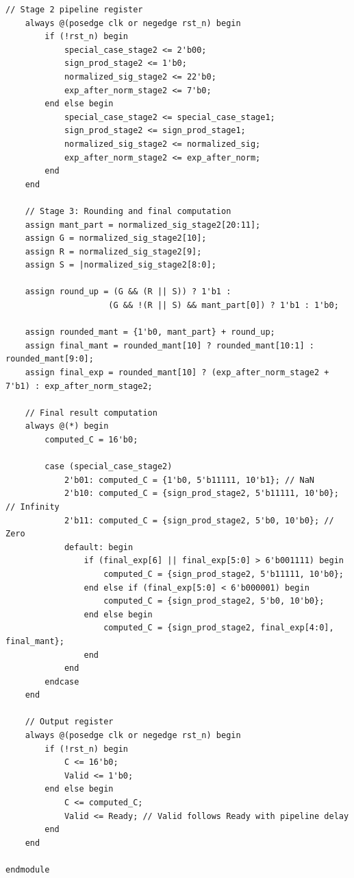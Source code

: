\documentclass[UTF8]{ctexart}
\begin{document}
\begin{lstlisting}[frame=shadowbox,caption=vRTL251119114743\_779.v]
    // Stage 2 pipeline register
    always @(posedge clk or negedge rst_n) begin
        if (!rst_n) begin
            special_case_stage2 <= 2'b00;
            sign_prod_stage2 <= 1'b0;
            normalized_sig_stage2 <= 22'b0;
            exp_after_norm_stage2 <= 7'b0;
        end else begin
            special_case_stage2 <= special_case_stage1;
            sign_prod_stage2 <= sign_prod_stage1;
            normalized_sig_stage2 <= normalized_sig;
            exp_after_norm_stage2 <= exp_after_norm;
        end
    end
    
    // Stage 3: Rounding and final computation
    assign mant_part = normalized_sig_stage2[20:11];
    assign G = normalized_sig_stage2[10];
    assign R = normalized_sig_stage2[9];
    assign S = |normalized_sig_stage2[8:0];
    
    assign round_up = (G && (R || S)) ? 1'b1 :
                     (G && !(R || S) && mant_part[0]) ? 1'b1 : 1'b0;
                     
    assign rounded_mant = {1'b0, mant_part} + round_up;
    assign final_mant = rounded_mant[10] ? rounded_mant[10:1] : rounded_mant[9:0];
    assign final_exp = rounded_mant[10] ? (exp_after_norm_stage2 + 7'b1) : exp_after_norm_stage2;
    
    // Final result computation
    always @(*) begin
        computed_C = 16'b0;
        
        case (special_case_stage2)
            2'b01: computed_C = {1'b0, 5'b11111, 10'b1}; // NaN
            2'b10: computed_C = {sign_prod_stage2, 5'b11111, 10'b0}; // Infinity
            2'b11: computed_C = {sign_prod_stage2, 5'b0, 10'b0}; // Zero
            default: begin
                if (final_exp[6] || final_exp[5:0] > 6'b001111) begin
                    computed_C = {sign_prod_stage2, 5'b11111, 10'b0};
                end else if (final_exp[5:0] < 6'b000001) begin
                    computed_C = {sign_prod_stage2, 5'b0, 10'b0};
                end else begin
                    computed_C = {sign_prod_stage2, final_exp[4:0], final_mant};
                end
            end
        endcase
    end
    
    // Output register
    always @(posedge clk or negedge rst_n) begin
        if (!rst_n) begin
            C <= 16'b0;
            Valid <= 1'b0;
        end else begin
            C <= computed_C;
            Valid <= Ready; // Valid follows Ready with pipeline delay
        end
    end

endmodule
\end{lstlisting}
\end{document}
